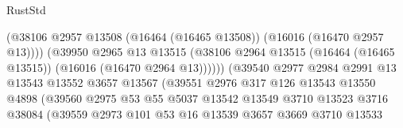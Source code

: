 \begin{lexlean}{RustStd}
\begin{coremodule}
                                            (@38106
                                              @2957
                                              @13508
                                              (@16464 (@16465 @13508))
                                              (@16016 (@16470 @2957 @13))))
                                          (@39950
                                            @2965
                                            @13
                                            @13515
                                            (@38106
                                              @2964
                                              @13515
                                              (@16464 (@16465 @13515))
                                              (@16016 (@16470 @2964 @13))))))
                                      (@39540
                                        @2977
                                        @2984
                                        @2991
                                        @13
                                        @13543
                                        @13552
                                        @3657
                                        @13567
                                        (@39551
                                          @2976
                                          @317
                                          @126
                                          @13543
                                          @13550
                                          @4898
                                          (@39560
                                            @2975
                                            @53
                                            @55
                                            @5037
                                            @13542
                                            @13549
                                            @3710
                                            @13523
                                            @3716
                                            @38084
                                            (@39559
                                              @2973
                                              @101
                                              @53
                                              @16
                                              @13539
                                              @3657
                                              @3669
                                              @3710
                                              @13533

\end{coremodule}
\end{lexlean}
